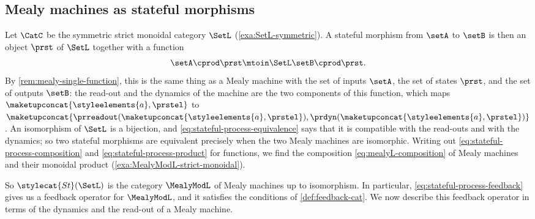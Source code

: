 \subsection{Mealy machines as stateful morphisms}
\label{sec:mealy-stateful-processes}

Let $\CatC$ be the symmetric strict monoidal category $\SetL$ (\cref{exa:SetL-symmetric}).
A stateful morphism from $\setA$ to $\setB$ is then an object $\prst$ of $\SetL$ together with a function
\begin{equation}
    \setA \cprod \prst \mtoin\SetL \setB \cprod \prst.
\end{equation}
By \cref{rem:mealy-single-function}, this is the same thing as a Mealy machine with the set of inputs $\setA$, the set of states $\prst$, and the set of outputs $\setB$: the read-out and the dynamics of the machine are the two components of this function, which maps $\maketupconcat{\styleelements{a}, \prstel}$ to $\maketupconcat{\prreadout(\maketupconcat{\styleelements{a}, \prstel}), \prdyn(\maketupconcat{\styleelements{a}, \prstel})}$.
An isomorphism of $\SetL$ is a bijection, and \cref{eq:stateful-process-equivalence} says that it is compatible with the read-outs and with the dynamics; so two stateful morphisms are equivalent precisely when the two Mealy machines are isomorphic.
Writing out \cref{eq:stateful-process-composition} and \cref{eq:stateful-process-product} for functions, we find the composition \cref{eq:mealyL-composition} of Mealy machines and their monoidal product (\cref{exa:MealyModL-strict-monoidal}).

So $\stylecat{St}(\SetL)$ is the category $\MealyModL$ of Mealy machines up to isomorphism.
In particular, \cref{eq:stateful-process-feedback} gives us a feedback operator for $\MealyModL$, and it satisfies the conditions of \cref{def:feedback-cat}.
We now describe this feedback operator in terms of the dynamics and the read-out of a Mealy machine.

